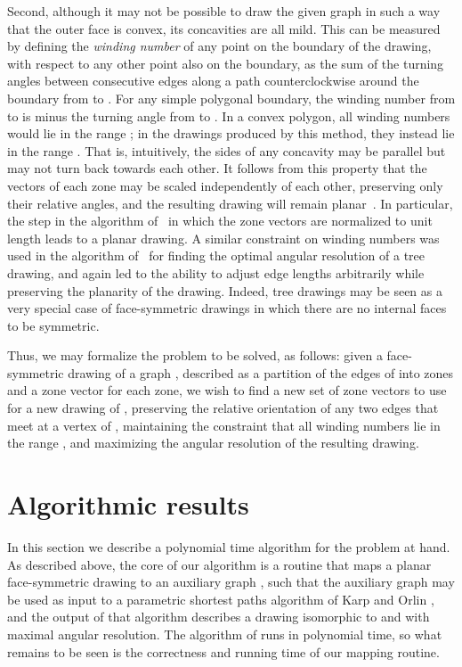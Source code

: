 \documentclass[11pt,letter]{article}
\begin{document}
Second, although it may not be possible to draw the given graph in
such a way that the outer face is convex, its concavities are all
mild. This can be measured by defining the \emph{winding number} of
any point  on the boundary of the drawing, with respect to any
other point  also on the boundary, as the sum of the turning angles
between consecutive edges along a path counterclockwise around the
boundary from  to . For any simple polygonal boundary, the
winding number from  to  is  minus the turning angle from
 to . In a convex polygon, all winding numbers would lie in the
range ; in the drawings produced by this method, they
instead lie in the range . That is, intuitively, the
sides of any concavity may be parallel but may not turn back towards
each other. It follows from this property that the vectors of each
zone may be scaled independently of each other, preserving only their
relative angles, and the resulting drawing will remain
planar~\cite{Epp-GD-04}. In particular, the step in the algorithm
of~\cite{Epp-GD-04} in which the zone vectors are normalized to unit
length leads to a planar drawing. A similar constraint on winding
numbers was used in the algorithm of~\cite{EppCar-GD-06} for finding
the optimal angular resolution of a tree drawing, and again led to the
ability to adjust edge lengths arbitrarily while preserving the
planarity of the drawing. Indeed, tree drawings may be seen as a very
special case of face-symmetric drawings in which there are no internal
faces to be symmetric.

Thus, we may formalize the problem to be solved, as follows: given a
face-symmetric drawing of a graph , described as a partition of the
edges of  into zones and a zone vector for each zone, we wish to
find a new set of zone vectors to use for a new drawing of ,
preserving the relative orientation of any two edges that meet at a
vertex of , maintaining the constraint that all winding numbers lie
in the range , and maximizing the angular resolution of
the resulting drawing.

\section{Algorithmic results}
\label{section:algorithm}

In this section we describe a polynomial time algorithm for the problem at hand.  As described above, the core of our algorithm is a routine that maps a planar face-symmetric drawing  to an auxiliary graph , such that the auxiliary graph may be used as input to a parametric shortest paths algorithm of Karp and Orlin \cite{KarOrl-DAM-81}, and the output of that algorithm describes a drawing  isomorphic to  and with maximal angular resolution.  The algorithm of \cite{KarOrl-DAM-81} runs in polynomial time, so what remains to be seen is the correctness and running time of our mapping routine.
\end{document}
